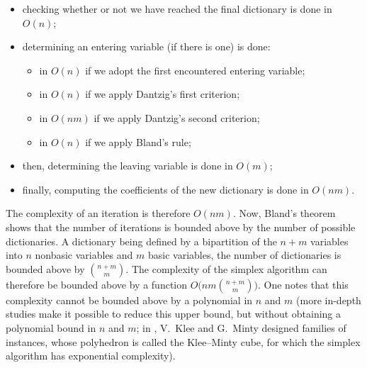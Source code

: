\begin{itemize}
  \item checking whether or not we have reached the final dictionary is done in \(O(n)\);
  \item determining an entering variable (if there is one) is done:
  \begin{itemize}
    \item in \(O(n)\) if we adopt the first encountered entering variable;
    \item in \(O(n)\) if we apply Dantzig’s first criterion;
    \item in \(O(nm)\) if we apply Dantzig’s second criterion;
    \item in \(O(n)\) if we apply Bland’s rule;
  \end{itemize}
  \item then, determining the leaving variable is done in \(O(m)\);
  \item finally, computing the coefficients of the new dictionary is done in \(O(nm)\).
\end{itemize}

The complexity of an iteration is therefore \(O(nm)\). Now, Bland’s theorem shows that the number of iterations is bounded above by the number of possible dictionaries. A dictionary being defined by a bipartition of the \(n+m\) variables into \(n\) nonbasic variables and \(m\) basic variables, the number of dictionaries is bounded above by \(\binom{n+m}{m}\). The complexity of the simplex algorithm can therefore be bounded above by a function \(O\!\big(nm\binom{n+m}{m}\big)\). One notes that this complexity cannot be bounded above by a polynomial in \(n\) and \(m\) (more in-depth studies make it possible to reduce this upper bound, but without obtaining a polynomial bound in \(n\) and \(m\); in \cite{kleeminty1972}, V.\ Klee and G.\ Minty designed families of instances, whose polyhedron is called the Klee--Minty cube, for which the simplex algorithm has exponential complexity).